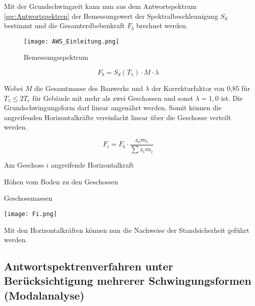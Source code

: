 Mit der Grundschwingzeit kann nun aus dem Antwortspektrum \cref{sec:Antwortspektren} der Bemessungswert der Spektralbeschleunigung $S_d$ bestimmt und die Gesamterdbebenkraft $F_b$ brechnet werden.

\begin{figure}[H]
    \centering
    \texttt{[image: AWS\_Einleitung.png]}
    \caption{Bemessungsspektrum}
\end{figure}

\begin{equation*}
F_b = S_d(T_1) \cdot M \cdot \lambda
\end{equation*}

Wobei $M$ die Gesamtmasse des Bauwerks und $\lambda$ der Korrekturfaktor von 0,85 für $T_1 \leq 2T_c$ für Gebäude mit mehr als zwei Geschossen und sonst $\lambda=1,0$ ist.
Die Grundschwingungsform darf linear angenährt werden. Somit können die angreifenden Horizontalkräfte vereinfacht linear über die Geschosse verteilt werden.

\begin{minipage}{0.6\textwidth}

\begin{equation*}
F_i = F_b \cdot \frac{z_i m_i}{\sum z_i m_i}
\end{equation*}

\vspace{2ex}
\vspace{2ex}

  Am Geschoss $i$ angreifende Horizontalkraft\par
{}  Höhen vom Boden zu den Geschossen\par
{}  Geschossmassen\par

\end{minipage}%
\hfill
\begin{minipage}{0.4\textwidth}

\begin{flushright}
\texttt{[image: Fi.png]}
\end{flushright}

\end{minipage}%

Mit den Horizontalkräften können nun die Nachweise der Standsicherheit geführt werden.

\subsection{Antwortspektrenverfahren unter Berücksichtigung mehrerer Schwingungsformen (Modalanalyse)}
\label{sec:Modalanalyse}

